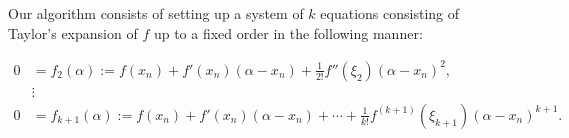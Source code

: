 \documentclass{article}
\begin{document}
Our algorithm consists of setting up a system of $k$ equations consisting of Taylor's expansion of $f$ up to a fixed order in the following manner:

\begin{equation}\label{Taylorpoly}
	\begin{aligned}
		0 &= f_{2}(\alpha) := f(x_{n})+f'(x_{n})(\alpha-x_{n})+\frac{1}{2!}f''(\xi_{2})(\alpha-x_{n})^{2},\\
		&\vdots\\
		0 &= f_{k+1}(\alpha) := f(x_{n})+f'(x_{n})(\alpha-x_{n})+\cdots+\frac{1}{k!}f^{(k+1)}(\xi_{k+1})(\alpha-x_{n})^{k+1}.
	\end{aligned}
\end{equation}
\end{document}
